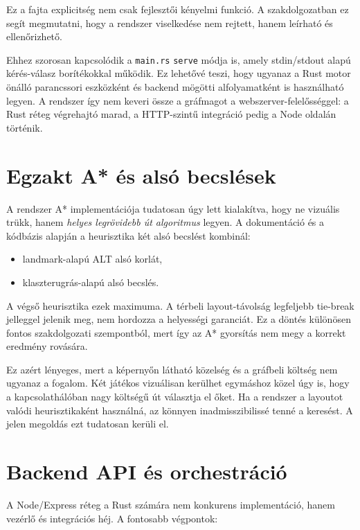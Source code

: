 \documentclass[a4paper,12pt]{report}
\begin{document}
Ez a fajta explicitség nem csak fejlesztői kényelmi funkció. A szakdolgozatban ez segít megmutatni, hogy a rendszer viselkedése nem rejtett, hanem leírható és ellenőrizhető.

Ehhez szorosan kapcsolódik a \texttt{main.rs} \texttt{serve} módja is, amely stdin/stdout alapú kérés-válasz borítékokkal működik. Ez lehetővé teszi, hogy ugyanaz a Rust motor önálló parancssori eszközként és backend mögötti alfolyamatként is használható legyen. A rendszer így nem keveri össze a gráfmagot a webszerver-felelősséggel: a Rust réteg végrehajtó marad, a HTTP-szintű integráció pedig a Node oldalán történik.

\section{Egzakt A* és alsó becslések}

A rendszer A* implementációja tudatosan úgy lett kialakítva, hogy ne vizuális trükk, hanem \emph{helyes legrövidebb út algoritmus} legyen. A dokumentáció és a kódbázis alapján a heurisztika két alsó becslést kombinál:

\begin{itemize}
    \item landmark-alapú ALT alsó korlát,
    \item klaszterugrás-alapú alsó becslés.
\end{itemize}

A végső heurisztika ezek maximuma. A térbeli layout-távolság legfeljebb tie-break jelleggel jelenik meg, nem hordozza a helyességi garanciát. Ez a döntés különösen fontos szakdolgozati szempontból, mert így az A* gyorsítás nem megy a korrekt eredmény rovására.

Ez azért lényeges, mert a képernyőn látható közelség és a gráfbeli költség nem ugyanaz a fogalom. Két játékos vizuálisan kerülhet egymáshoz közel úgy is, hogy a kapcsolathálóban nagy költségű út választja el őket. Ha a rendszer a layoutot valódi heurisztikaként használná, az könnyen inadmisszibilissé tenné a keresést. A jelen megoldás ezt tudatosan kerüli el.

\section{Backend API és orchestráció}

A Node/Express réteg a Rust számára nem konkurens implementáció, hanem vezérlő és integrációs héj. A fontosabb végpontok:
\end{document}

